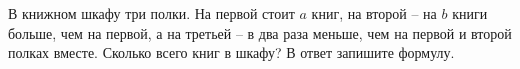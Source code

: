 \begin{ex}
	\begin{condition}
		В книжном шкафу три полки. На первой стоит \( a \) книг, на
		второй – на \( b \) книги больше, чем на первой, а на третьей – в два раза меньше, чем на первой и
		второй полках вместе. Сколько всего книг в шкафу? В ответ запишите формулу.
	\end{condition}
\end{ex}